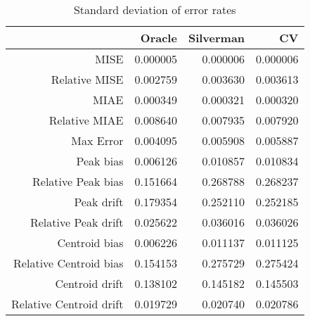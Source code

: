 \begin{table}[ht]
\centering
\begin{tabular}{rrrr}
  \hline
 & Oracle & Silverman & CV \\ 
  \hline
MISE & 0.000005 & 0.000006 & 0.000006 \\ 
  Relative MISE & 0.002759 & 0.003630 & 0.003613 \\ 
  MIAE & 0.000349 & 0.000321 & 0.000320 \\ 
  Relative MIAE & 0.008640 & 0.007935 & 0.007920 \\ 
  Max Error & 0.004095 & 0.005908 & 0.005887 \\ 
  Peak bias & 0.006126 & 0.010857 & 0.010834 \\ 
  Relative Peak bias & 0.151664 & 0.268788 & 0.268237 \\ 
  Peak drift & 0.179354 & 0.252110 & 0.252185 \\ 
  Relative Peak drift & 0.025622 & 0.036016 & 0.036026 \\ 
  Centroid bias & 0.006226 & 0.011137 & 0.011125 \\ 
  Relative Centroid bias & 0.154153 & 0.275729 & 0.275424 \\ 
  Centroid drift & 0.138102 & 0.145182 & 0.145503 \\ 
  Relative Centroid drift & 0.019729 & 0.020740 & 0.020786 \\ 
   \hline
\end{tabular}
\caption{Standard deviation of error rates} 
\label{tbl:stddev_error_rates}
\end{table}
